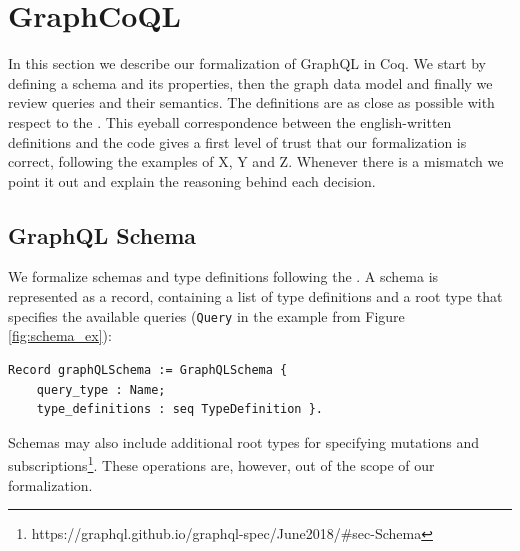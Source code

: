 \section{GraphCoQL}\label{sec:form}

 In this section we describe our formalization of GraphQL in Coq. We start by defining a schema and its properties, then the graph data model and finally we review queries and their semantics. The definitions are as close as possible with respect to the \spec{}. This eyeball correspondence between the english-written definitions and the code gives a first level of trust that our formalization is correct, following the examples of X, Y and Z. Whenever there is a mismatch we point it out and explain the reasoning behind each decision.


\subsection{GraphQL Schema}\label{subsec:schema}
We formalize schemas and type definitions following the \spec{}. A schema is represented as a record, containing a list of type definitions and a root type that specifies the available queries (\eg \texttt{Query} in the example from Figure \ref{fig:schema_ex}):
%

\begin{verbatim}
Record graphQLSchema := GraphQLSchema {
    query_type : Name;
    type_definitions : seq TypeDefinition }.
\end{verbatim}
%
Schemas may also include additional root types for specifying mutations and subscriptions\footnote{https://graphql.github.io/graphql-spec/June2018/\#sec-Schema}. These operations are, however, out of the scope of our formalization.

